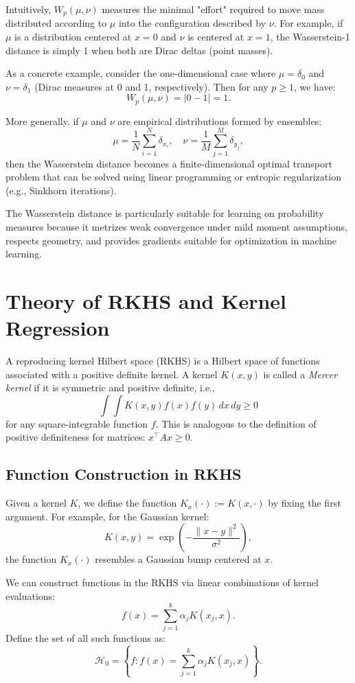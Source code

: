 \documentclass[twoside,11pt]{article}
\begin{document}
Intuitively, $W_p(\mu, \nu)$ measures the minimal "effort" required to move mass distributed according to $\mu$ into the configuration described by $\nu$. For example, if $\mu$ is a distribution centered at $x=0$ and $\nu$ is centered at $x=1$, the Wasserstein-1 distance is simply 1 when both are Dirac deltas (point masses).

As a concrete example, consider the one-dimensional case where $\mu = \delta_0$ and $\nu = \delta_1$ (Dirac measures at 0 and 1, respectively). Then for any $p \ge 1$, we have:
\[
W_p(\mu, \nu) = |0 - 1| = 1.
\]

More generally, if $\mu$ and $\nu$ are empirical distributions formed by ensembles:
\[
\mu = \frac{1}{N} \sum_{i=1}^N \delta_{x_i}, \quad \nu = \frac{1}{M} \sum_{j=1}^M \delta_{y_j},
\]
then the Wasserstein distance becomes a finite-dimensional optimal transport problem that can be solved using linear programming or entropic regularization (e.g., Sinkhorn iterations).

The Wasserstein distance is particularly suitable for learning on probability measures because it metrizes weak convergence under mild moment assumptions, respects geometry, and provides gradients suitable for optimization in machine learning.
\section{Theory of RKHS and Kernel Regression}

A reproducing kernel Hilbert space (RKHS) is a Hilbert space of functions associated with a positive definite kernel. A kernel \( K(x, y) \) is called a \emph{Mercer kernel} if it is symmetric and positive definite, i.e.,
\[
\int \int K(x, y) f(x) f(y) \, dx \, dy \geq 0
\]
for any square-integrable function \( f \). This is analogous to the definition of positive definiteness for matrices: \( x^\top A x \geq 0 \).

\subsection{Function Construction in RKHS}

Given a kernel \( K \), we define the function \( K_x(\cdot) := K(x, \cdot) \) by fixing the first argument. For example, for the Gaussian kernel:
\[
K(x, y) = \exp\left(-\frac{\|x - y\|^2}{\sigma^2}\right),
\]
the function \( K_x(\cdot) \) resembles a Gaussian bump centered at \( x \).

We can construct functions in the RKHS via linear combinations of kernel evaluations:
\[
f(x) = \sum_{j=1}^k \alpha_j K(x_j, x).
\]
Define the set of all such functions as:
\[
\mathcal{H}_0 = \left\{ f : f(x) = \sum_{j=1}^k \alpha_j K(x_j, x) \right\}.
\]
\end{document}
